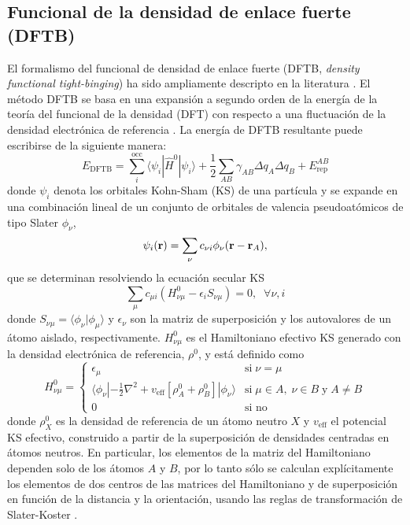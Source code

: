 \subsection{Funcional de la densidad de enlace fuerte (DFTB)}\label{s:dftb}

El formalismo del funcional de densidad de enlace fuerte (DFTB, \textit{density
functional tight-binging}) ha sido ampliamente descripto en la literatura 
\cite{elstner1998,frauenheim2000,seifert2007,gaus2011}. El método DFTB se basa 
en una expansión a segundo orden de la energía de la teoría del funcional de la 
densidad (DFT) con respecto a una fluctuación de la densidad electrónica de 
referencia \cite{foulkes1989}. La energía de DFTB resultante puede escribirse de 
la siguiente manera:
\begin{equation}\label{eq:dftb}
    E_{\text{DFTB}}=\sum_i^{\text{occ}}\langle\psi_i|\hat{H}^0|\psi_i\rangle+\frac{1}{2}\sum_{AB}\gamma_{AB}\Delta q_A\Delta q_B+E_{\text{rep}}^{AB}
\end{equation}
donde $\psi_i$ denota los orbitales Kohn-Sham (KS) de una partícula
y se expande en una combinación lineal de un conjunto de orbitales de valencia pseudoatómicos de tipo Slater $\phi_\nu$,
\begin{equation}
    \psi_i({\bf r})=\sum_\nu c_{\nu i}\phi_\nu({\bf r}-{\bf r}_A),
\end{equation}
que se determinan resolviendo la ecuación secular KS
\begin{equation}\label{eq:ks}
    \sum_\mu c_{\mu i}\left(H^0_{\nu\mu}-\epsilon_iS_{\nu\mu}\right)=0, \;\;\forall \nu,i
\end{equation}
donde $S_{\nu\mu}=\langle \phi_\nu| \phi_\mu\rangle$ y $\epsilon_\nu$ son la 
matriz de superposición y los autovalores de un átomo aislado, respectivamente.
${H}^0_{\nu\mu}$ es el Hamiltoniano efectivo KS generado con la densidad 
electrónica de referencia, $\rho^0$, y está definido como
\begin{equation}\label{eq:h0}
    H^0_{\nu\mu}=\begin{cases}
        \epsilon_\mu & \text{si}\; \nu=\mu\\
        \langle \phi_{\nu}| -\frac{1}{2}\nabla^2+v_{\text{eff}}\left[\rho_A^0+\rho_B^0\right]|\phi_{\nu}\rangle&\text{si}\;\mu\in A,\; \nu\in B\;\text{y} \;A\ne B\\
        0& \text{si no}
    \end{cases}
\end{equation}
donde $\rho_X^0$ es la densidad de referencia de un átomo neutro $X$ y 
$v_{\text{eff}}$ el potencial KS efectivo, construido a partir de la superposición
de densidades centradas en átomos neutros. En particular, los elementos de la 
matriz del Hamiltoniano dependen solo de los átomos $A$ y $B$, por lo tanto sólo
se calculan explícitamente los elementos de dos centros de las matrices del 
Hamiltoniano y de superposición en función de la distancia y la orientación, usando 
las reglas de transformación de Slater-Koster \cite{slater1954}.

